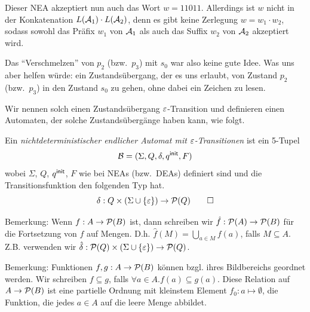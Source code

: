 \begin{Bsp}
\begin{center}
  \end{center}
Dieser \acs*{NEA} akzeptiert nun auch das Wort $w=11011$. Allerdings ist $w$ nicht in der Konkatenation $L(\mathcal{A}_1)\cdot L(\mathcal{A}_2)$, denn es gibt keine Zerlegung $w=w_1\cdot w_2$, sodass sowohl das Präfix $w_1$ von $\mathcal{A}_1$ als auch das Suffix $w_2$ von $\mathcal{A}_2$ akzeptiert wird.
\end{Bsp}


Das "`Verschmelzen"' von $p_2$ (bzw.\ $p_3$) mit $s_0$ war also keine gute Idee.
Was uns aber helfen würde: ein Zustandsübergang, der es uns erlaubt, von Zustand $p_2$ (bzw.\ $p_3$) in den Zustand $s_0$ zu gehen, ohne dabei ein Zeichen zu lesen.

Wir nennen solch einen Zustandsübergang $\varepsilon$-Transition und definieren einen Automaten, der solche Zustandsübergänge haben kann, wie folgt.

\begin{Def}\label{def2.EpsNea}
        Ein \emph{nichtdeterministischer endlicher Automat mit $\varepsilon$-Transitionen} ist ein 5-Tupel
        \[ \mathcal{B}= (\Sigma, Q,\delta,q^\mathsf{init},F) \]
wobei $\Sigma$, $Q$, $q^\mathsf{init}$, $F$ wie bei \acs*{NEA}s (bzw.\ \acs*{DEA}s) definiert sind und die Transitionsfunktion den folgenden Typ hat.
\[
\delta:Q\x(\Sigma\cup\{\Eps\})\->\mathcal{P}(Q)
\qedhere
\]
\end{Def}

Bemerkung: Wenn $f : A \to \mathcal{P} (B)$ ist, dann schreiben wir $\hat{f} : \mathcal{P} (A) \to \mathcal{P} (B)$ für die Fortsetzung von $f$ auf Mengen. D.h. $\hat{f} (M) = \bigcup_{a \in M} f(a)$, falls $M \subseteq A$.
Z.B. verwenden wir $\hat\delta : \mathcal{P} (Q) \times (\Sigma \cup\{\varepsilon\}) \to \mathcal{P} (Q)$.

Bemerkung: Funktionen $f, g : A \to \mathcal{P} (B)$ können bzgl. ihres Bildbereichs geordnet werden. Wir schreiben $f \subseteq g$, falls $\forall a \in A. f(a) \subseteq g(a)$.
Diese Relation auf $A \to \mathcal{P} (B)$ ist eine partielle Ordnung mit kleinstem Element $f_0 : a \mapsto \emptyset$, die Funktion, die jedes $a\in A$ auf die leere Menge abbildet.


